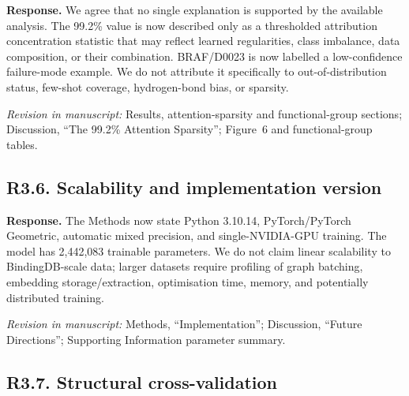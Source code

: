 \documentclass[11pt,a4paper]{article}
\newcommand{\response}{\noindent\textbf{Response.} }
\newcommand{\change}[1]{\par\smallskip\noindent\textit{Revision in manuscript:} #1\par\medskip}
\begin{document}
\response We agree that no single explanation is supported by the available
analysis.  The 99.2\% value is now described only as a thresholded attribution
concentration statistic that may reflect learned regularities, class imbalance,
data composition, or their combination.  BRAF/D0023 is now labelled a
low-confidence failure-mode example.  We do not attribute it specifically to
out-of-distribution status, few-shot coverage, hydrogen-bond bias, or sparsity.

\change{Results, attention-sparsity and functional-group sections; Discussion,
``The 99.2\% Attention Sparsity''; Figure~6 and functional-group tables.}

\subsection*{R3.6. Scalability and implementation version}


\response The Methods now state Python 3.10.14, PyTorch/PyTorch Geometric,
automatic mixed precision, and single-NVIDIA-GPU training.  The model has
2,442,083 trainable parameters.  We do not claim linear scalability to
BindingDB-scale data; larger datasets require profiling of graph batching,
embedding storage/extraction, optimisation time, memory, and potentially
distributed training.

\change{Methods, ``Implementation''; Discussion, ``Future Directions'';
Supporting Information parameter summary.}

\subsection*{R3.7. Structural cross-validation}
\end{document}
